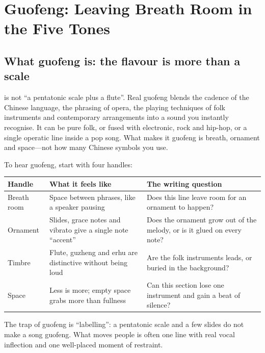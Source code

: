 \chapter{Guofeng: Leaving Breath Room in the Five Tones}
\label{ch:genre-guofeng-deep}


\section{What guofeng is: the flavour is more than a scale}
\label{sec:guofeng-what}

 is not ``a pentatonic scale plus a flute''. Real guofeng blends the cadence of the Chinese language, the phrasing of opera, the playing techniques of folk instruments and contemporary arrangements into a sound you instantly recognise. It can be pure folk, or fused with electronic, rock and hip-hop, or a single operatic line inside a pop song. What makes it guofeng is breath, ornament and space---not how many Chinese symbols you use.

To hear guofeng, start with four handles:

\begin{longtable}{p{}p{}p{}}
\toprule
Handle & What it feels like & The writing question \\
\midrule
Breath room & Space between phrases, like a speaker pausing & Does this line leave room for an ornament to happen? \\
Ornament & Slides, grace notes and vibrato give a single note ``accent'' & Does the ornament grow out of the melody, or is it glued on every note? \\
Timbre & Flute, guzheng and erhu are distinctive without being loud & Are the folk instruments leads, or buried in the background? \\
Space & Less is more; empty space grabs more than fullness & Can this section lose one instrument and gain a beat of silence? \\
\bottomrule
\end{longtable}

The trap of guofeng is ``labelling'': a pentatonic scale and a few slides do not make a song guofeng. What moves people is often one line with real vocal inflection and one well-placed moment of restraint.

